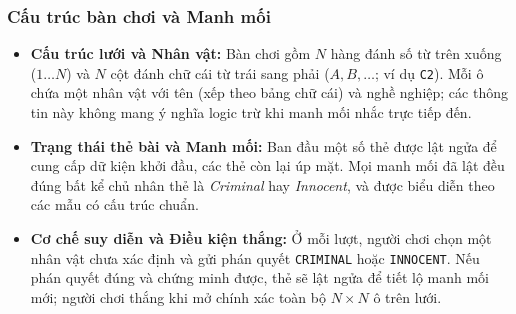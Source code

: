 \documentclass[12pt,a4paper]{article}
\begin{document}
    \subsubsection{Cấu trúc bàn chơi và Manh mối}
    \begin{itemize}
        \item \textbf{Cấu trúc lưới và Nhân vật:} Bàn chơi gồm $N$ hàng đánh số từ trên xuống ($1 \dots N$) và $N$ cột đánh chữ cái từ trái sang phải ($A, B, \dots$; ví dụ \texttt{C2}). Mỗi ô chứa một nhân vật với tên (xếp theo bảng chữ cái) và nghề nghiệp; các thông tin này không mang ý nghĩa logic trừ khi manh mối nhắc trực tiếp đến.

        \item \textbf{Trạng thái thẻ bài và Manh mối:} Ban đầu một số thẻ được lật ngửa để cung cấp dữ kiện khởi đầu, các thẻ còn lại úp mặt. Mọi manh mối đã lật đều đúng bất kể chủ nhân thẻ là \emph{Criminal} hay \emph{Innocent}, và được biểu diễn theo các mẫu có cấu trúc chuẩn.

        \item \textbf{Cơ chế suy diễn và Điều kiện thắng:} Ở mỗi lượt, người chơi chọn một nhân vật chưa xác định và gửi phán quyết \texttt{CRIMINAL} hoặc \texttt{INNOCENT}. Nếu phán quyết đúng và chứng minh được, thẻ sẽ lật ngửa để tiết lộ manh mối mới; người chơi thắng khi mở chính xác toàn bộ $N \times N$ ô trên lưới.
    \end{itemize}
\end{document}
